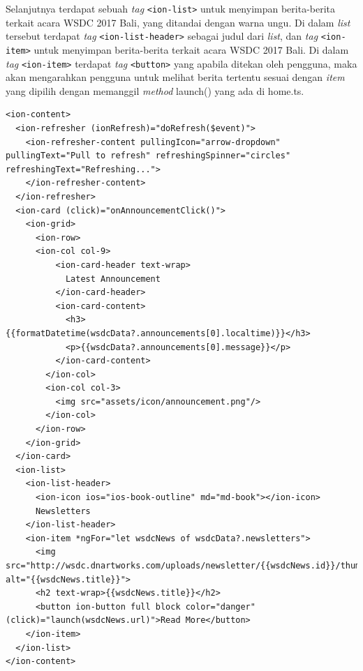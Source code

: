 \begin{enumerate}
\begin{itemize}
		Selanjutnya terdapat sebuah \textit{tag} \texttt{<ion-list>} untuk menyimpan berita-berita terkait acara WSDC 2017 Bali, yang ditandai dengan warna ungu. Di dalam \textit{list} tersebut terdapat \textit{tag} \texttt{<ion-list-header>} sebagai judul dari \textit{list}, dan \textit{tag} \texttt{<ion-item>} untuk menyimpan berita-berita terkait acara WSDC 2017 Bali. Di dalam \textit{tag} \texttt{<ion-item>} terdapat \textit{tag} \texttt{<button>} yang apabila ditekan oleh pengguna, maka akan mengarahkan pengguna untuk melihat berita tertentu sesuai dengan \textit{item} yang dipilih dengan memanggil \textit{method} launch() yang ada di home.ts. 	
		
\begin{lstlisting}[label={lst:contentHome}, caption=\textit{Content} pada home.html]
<ion-content>
  <ion-refresher (ionRefresh)="doRefresh($event)">
    <ion-refresher-content pullingIcon="arrow-dropdown" pullingText="Pull to refresh" refreshingSpinner="circles" refreshingText="Refreshing...">
    </ion-refresher-content>
  </ion-refresher>
  <ion-card (click)="onAnnouncementClick()">
    <ion-grid>
      <ion-row>
      <ion-col col-9>
          <ion-card-header text-wrap>
            Latest Announcement
          </ion-card-header>
          <ion-card-content>
            <h3>{{formatDatetime(wsdcData?.announcements[0].localtime)}}</h3>
            <p>{{wsdcData?.announcements[0].message}}</p>
          </ion-card-content>
        </ion-col>
        <ion-col col-3>
          <img src="assets/icon/announcement.png"/>
        </ion-col>
      </ion-row>
    </ion-grid>
  </ion-card>
  <ion-list>
    <ion-list-header>
      <ion-icon ios="ios-book-outline" md="md-book"></ion-icon>
      Newsletters
    </ion-list-header>
    <ion-item *ngFor="let wsdcNews of wsdcData?.newsletters">
      <img src="http://wsdc.dnartworks.com/uploads/newsletter/{{wsdcNews.id}}/thumbnail.jpg" alt="{{wsdcNews.title}}">
      <h2 text-wrap>{{wsdcNews.title}}</h2>
      <button ion-button full block color="danger" (click)="launch(wsdcNews.url)">Read More</button>
    </ion-item>
  </ion-list>
</ion-content>
\end{lstlisting}
		
		
	\end{itemize}


\end{enumerate}
